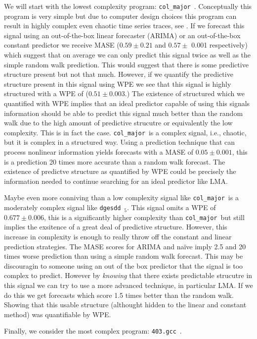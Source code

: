 \documentclass{article}
\newcommand{\gcc}{{\tt 403.gcc}~}
\newcommand{\svd}{{\tt dgesdd}~}
\newcommand{\col}{{\tt col\_major}~}
\begin{document}
We will start with the lowest complexity program: \col. Conceptually this program is very simple but due to computer design choices this program can result in highly complex even chaotic time series traces, see \cite{toddchaos}. If we forecast this signal using an out-of-the-box linear forecaster (ARIMA) or an out-of-the-box constant predictor we receive MASE ($0.59 \pm 0.21$ and $0.57 \pm$ 0.001 respectively) which suggest that on average we can only predict this signal twice as well as the simple random walk prediction. This would suggest that there is some predictive structure present but not that much. However, if we quantify the predictive structure present in this signal using WPE we see that this signal is highly structured with a WPE of ($0.51 \pm 0.003$.) The existence of structured which we quantified with WPE implies that an ideal predictor capable of using this signals information should be able to predict this signal much better than the random walk due to the high amount of predictive strucutre or equivalently the low complexity. This is in fact the case. \col is a complex signal, i.e., chaotic, but it is complex in a structured way. Using a prediction technique that can process nonlinear information yields forecasts with a MASE of $0.05 \pm 0.001$, this is a prediction 20 times more accurate than a random walk forecast. The existence of predictve structure as quantified by WPE could be precisely the information needed to continue searching for an ideal predictor like LMA. 

Maybe even more conniving than a low complexity signal like \col is a moderately complex signal like \svd$_5$. This signal omits a WPE of $0.677 \pm 0.006$, this is a significantly higher complexity than \col but still implies the exsitence of a great deal of predictive structure. However, this increase in complexity is enough to really throw off the constant and linear prediction strategies. The MASE scores for ARIMA and na\"ive imply 2.5 and 20 times worse prediction than using a simple random walk forecast. This may be discouragin to someone using an out of the box predictor that the signal is too complex to predict. However by \emph{knowing} that there exists predictable strucutre in this signal we can try to use a more advanced technique, in particular LMA. If we do this we get forecasts which score 1.5 times better than the random walk. Showing that this usable structure (althought hidden to the linear and constant method) was quantifiable by WPE.

Finally, we consider the most complex program: \gcc.
\end{document}
